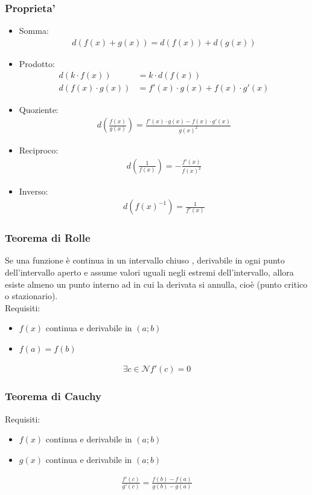 \documentclass[a4paper]{article}
\begin{document}
	\subsubsection{Proprieta'}
	\begin{itemize}
		\item Somma:
		\begin{align*}
			d(f(x) + g(x)) = d(f(x))+d(g(x))
		\end{align*}
		\item  Prodotto:
		\begin{align*}
			d(k \cdot f(x)) &= k \cdot d(f(x))\\
			d(f(x) \cdot g(x)) &= f'(x) \cdot g(x) + f(x) \cdot g'(x)
		\end{align*}
		\item Quoziente:
		\begin{align*}
			d\left( \frac{f(x)}{g(x)} \right) = \frac{f'(x) \cdot g(x) - f(x) \cdot g'(x)}{g(x)^2}
		\end{align*}
		\item Reciproco:
		\begin{align*}
			d\left( \frac{1}{f(x)} \right) = -\frac{f'(x)}{f(x)^2}
		\end{align*}
		\item Inverso:
		\begin{align*}
			d \left( f(x)^{-1} \right) = \frac{1}{f'(x)}
		\end{align*}
	\end{itemize}
\newpage
	\subsubsection{Teorema di Rolle}
	Se una funzione è continua in un intervallo chiuso , derivabile in ogni punto dell'intervallo aperto e assume valori uguali negli estremi dell'intervallo, allora esiste almeno un punto interno ad in cui la derivata si annulla, cioè (punto critico o stazionario).
	\\Requisiti:
	\begin{itemize}
		\item $f(x)$ continua e derivabile in $(a;b)$
		\item $f(a) = f(b)$
	\end{itemize}
	\begin{align*}
		\exists c \in \mathcal{N} f'(c) = 0
	\end{align*}
	\subsubsection{Teorema di Cauchy}
	Requisiti:
	\begin{itemize}
		\item $f(x)$ continua e derivabile in $(a;b)$
		\item $g(x)$ continua e derivabile in $(a;b)$
	\end{itemize}
	\begin{align*}
	\frac{f'(c)}{g'(c)} = \frac{f(b)-f(a)}{g(b)-g(a)}
	\end{align*}
	
\end{document}
